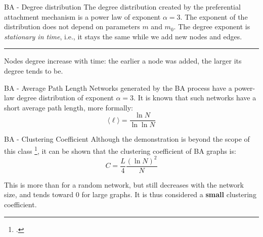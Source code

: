 \documentclass[a4paper,11pt]{book}
\begin{document}
\begin{textbox}{BA - Degree distribution }
The degree distribution created by the preferential attachment mechanism is a power law of exponent $ \alpha=3$. The exponent of the distribution does not depend on parameters $m$ and $m_0$. The degree exponent is \textit{stationary in time}, i.e., it stays the same while we add new nodes and edges.

\noindent\rule{4cm}{0.1pt}

Nodes degree increase with time: the earlier a node was added, the larger its degree tends to be. %

\end{textbox}





\begin{textbox}{BA - Average Path Length }
Networks generated by the BA process have a power-law degree distribution of exponent $ \alpha=3$. It is known that such networks have a short average path length, more formally:
\[
\langle \ell \rangle=\frac{\ln N}{\ln \ln N}
\]

\end{textbox}


\begin{textbox}{BA - Clustering Coefficient }
Although the demonstration is beyond the scope of this class \footcite{barabasi1999emergence}, it can be shown that the clustering coefficient of BA graphs is:
\[
C=\frac{L}{4}\frac{(\ln N)^2}{N}
\]

This is more than for a random network, but still decreases with the network size, and tends toward 0 for large graphs. It is thus considered a \textbf{small} clustering coefficient.

\end{textbox}
\end{document}

